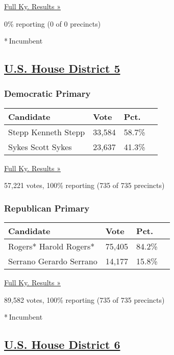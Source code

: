 \href{https://www.nytimes3xbfgragh.onion/elections/results/kentucky}{Full
Ky. Results »}

0\% reporting (0 of 0 precincts)

* Incumbent

\hypertarget{us-house-district-5}{%
\subsection{\texorpdfstring{\href{https://www.nytimes3xbfgragh.onion/elections/results/kentucky-house-district-5-primary-election}{U.S.
House District 5}}{U.S. House District 5}}\label{us-house-district-5}}

\hypertarget{democratic-primary-4}{%
\subsubsection{Democratic Primary}\label{democratic-primary-4}}

\begin{longtable}[]{@{}llll@{}}
\toprule
Candidate & Vote & Pct. &\tabularnewline
\midrule
\endhead
 Stepp Kenneth Stepp & 33,584 & 58.7\% &\tabularnewline
 Sykes Scott Sykes & 23,637 & 41.3\% &\tabularnewline
\bottomrule
\end{longtable}

\href{https://www.nytimes3xbfgragh.onion/elections/results/kentucky}{Full
Ky. Results »}

57,221 votes, 100\% reporting (735 of 735 precincts)

\hypertarget{republican-primary-4}{%
\subsubsection{Republican Primary}\label{republican-primary-4}}

\begin{longtable}[]{@{}llll@{}}
\toprule
Candidate & Vote & Pct. &\tabularnewline
\midrule
\endhead
 Rogers* Harold Rogers* & 75,405 & 84.2\% &\tabularnewline
 Serrano Gerardo Serrano & 14,177 & 15.8\% &\tabularnewline
\bottomrule
\end{longtable}

\href{https://www.nytimes3xbfgragh.onion/elections/results/kentucky}{Full
Ky. Results »}

89,582 votes, 100\% reporting (735 of 735 precincts)

* Incumbent

\hypertarget{us-house-district-6}{%
\subsection{\texorpdfstring{\href{https://www.nytimes3xbfgragh.onion/elections/results/kentucky-house-district-6-primary-election}{U.S.
House District 6}}{U.S. House District 6}}\label{us-house-district-6}}

